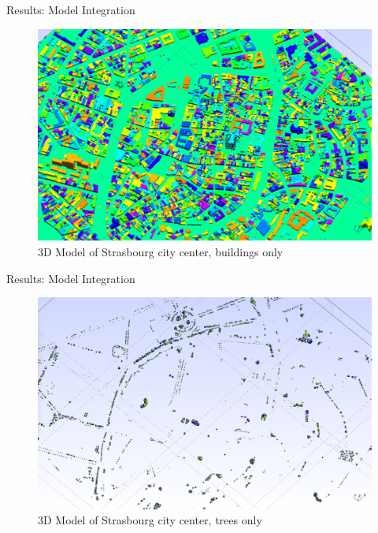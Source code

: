 \documentclass[10pt]{beamer}
\begin{document}
\begin{frame}{Results: Model Integration}
	\begin{figure}
		\centering
		\includegraphics[width=\textwidth]{images/integration_buildings_only.png}
		\caption{3D Model of Strasbourg city center, buildings only}
		\label{fig:figure1}
	\end{figure}
\end{frame}

\begin{frame}{Results: Model Integration}
	\begin{figure}
		\centering
		\includegraphics[width=\textwidth]{images/integration_trees_only.png}
		\caption{3D Model of Strasbourg city center, trees only}
		\label{fig:figure1}
	\end{figure}
\end{frame}
\end{document}
